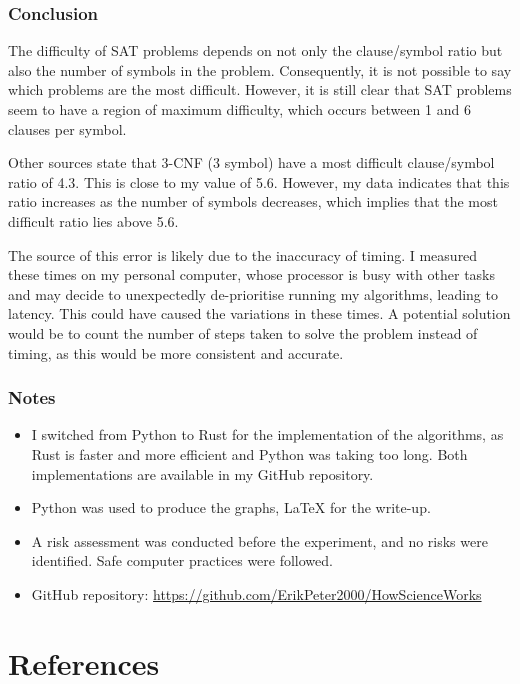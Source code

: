 \documentclass{article}
\begin{document}
    \subsubsection{Conclusion}
    
    The difficulty of SAT problems depends on not only the clause/symbol ratio but also the number of symbols in the problem. Consequently, it is not possible to say which problems are the most difficult. However, it is still clear that SAT problems seem to have a region of maximum difficulty, which occurs between 1 and 6 clauses per symbol.

    Other sources state that 3-CNF (3 symbol) have a most difficult clause/symbol ratio of 4.3.\supercite{Norvig_2021} This is close to my value of 5.6. However, my data indicates that this ratio increases as the number of symbols decreases, which implies that the most difficult ratio lies above 5.6.

    The source of this error is likely due to the inaccuracy of timing. I measured these times on my personal computer, whose processor is busy with other tasks and may decide to unexpectedly de-prioritise running my algorithms, leading to latency. This could have caused the variations in these times. A potential solution would be to count the number of steps taken to solve the problem instead of timing, as this would be more consistent and accurate.

    \subsubsection{Notes}

    \begin{itemize}
        \item I switched from Python to Rust\supercite{rust-lang} for the implementation of the algorithms, as Rust is faster and more efficient and Python was taking too long. Both implementations are available in my GitHub repository.
        \item Python was used to produce the graphs, LaTeX for the write-up.
        \item A risk assessment was conducted before the experiment, and no risks were identified. Safe computer practices were followed.
        \item GitHub repository: \url{https://github.com/ErikPeter2000/HowScienceWorks}
    \end{itemize}

    \section{References}
    \printbibliography[heading=none]
\end{document}

